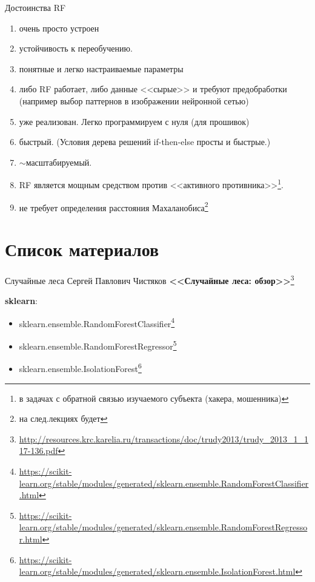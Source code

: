 \begin{frame}{Достоинства RF}
	\footnotesize
	\begin{enumerate}
		\item очень просто устроен
		\item устойчивость к переобучению. 
		\item понятные и легко настраиваемые параметры
		\item либо RF работает, либо данные <<сырые>> и требуют предобработки (например выбор паттернов в изображении нейронной сетью)
		\item уже реализован. Легко программируем с нуля (для прошивок)
		\item быстрый. (Условия дерева решений if-then-else просты и быстрые.)
		\item $\sim$масштабируемый.
		\item RF является мощным средством против <<активного противника>>\footnote{
			в задачах с обратной связью изучаемого субъекта (хакера, мошенника)
		}. 
		\item не требует определения расстояния Махаланобиса\footnote{на след.лекциях будет}
	\end{enumerate}
\end{frame}

\section{Список материалов}

\begin{frame}{Случайные леса}
	Сергей Павлович Чистяков \textbf{<<Случайные леса: обзор>>}\footnote{\tiny
	\url{http://resources.krc.karelia.ru/transactions/doc/trudy2013/trudy_2013_1_117-136.pdf}
	}
	
	\textbf{sklearn}:
	\begin{itemize}
	\item sklearn.ensemble.RandomForestClassifier\footnote{
	\tiny \url{https://scikit-learn.org/stable/modules/generated/sklearn.ensemble.RandomForestClassifier.html}
	}
	\item sklearn.ensemble.RandomForestRegressor\footnote{
	\tiny
	\url{https://scikit-learn.org/stable/modules/generated/sklearn.ensemble.RandomForestRegressor.html}
	}
	\item sklearn.ensemble.IsolationForest\footnote{
	\tiny
	\url{https://scikit-learn.org/stable/modules/generated/sklearn.ensemble.IsolationForest.html}
	}
	\end{itemize}
\end{frame}

